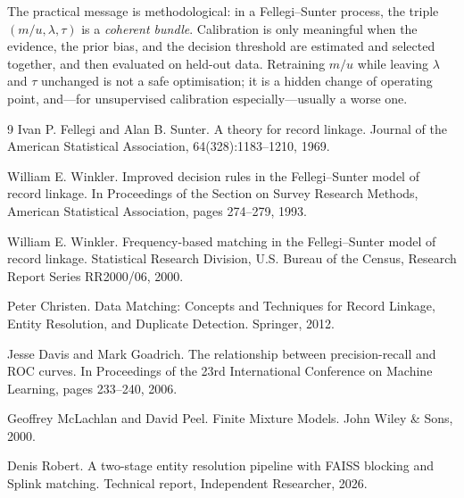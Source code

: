 \documentclass[conference]{IEEEtran}
\begin{document}
The practical message is methodological: in a Fellegi--Sunter process, the triple
$(m/u,\lambda,\tau)$ is a \emph{coherent bundle}. Calibration is only meaningful when the
evidence, the prior bias, and the decision threshold are estimated and selected together,
and then evaluated on held-out data. Retraining $m/u$ while leaving $\lambda$ and $\tau$
unchanged is not a safe optimisation; it is a hidden change of operating point, and---for
unsupervised calibration especially---usually a worse one.

\begin{thebibliography}{9}
Ivan P. Fellegi and Alan B. Sunter.
\newblock A theory for record linkage.
\newblock Journal of the American Statistical Association, 64(328):1183--1210, 1969.

William E. Winkler.
\newblock Improved decision rules in the Fellegi--Sunter model of record linkage.
\newblock In Proceedings of the Section on Survey Research Methods, American Statistical Association, pages 274--279, 1993.

William E. Winkler.
\newblock Frequency-based matching in the Fellegi--Sunter model of record linkage.
\newblock Statistical Research Division, U.S. Bureau of the Census, Research Report Series RR2000/06, 2000.

Peter Christen.
\newblock Data Matching: Concepts and Techniques for Record Linkage, Entity Resolution, and Duplicate Detection.
\newblock Springer, 2012.

Jesse Davis and Mark Goadrich.
\newblock The relationship between precision-recall and ROC curves.
\newblock In Proceedings of the 23rd International Conference on Machine Learning, pages 233--240, 2006.

Geoffrey McLachlan and David Peel.
\newblock Finite Mixture Models.
\newblock John Wiley \& Sons, 2000.

Denis Robert.
\newblock A two-stage entity resolution pipeline with FAISS blocking and Splink matching.
\newblock Technical report, Independent Researcher, 2026.
\end{thebibliography}
\end{document}
